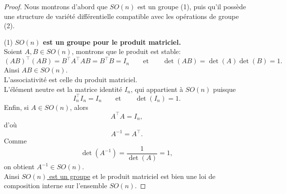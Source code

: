 \documentclass[12pt]{report}
\begin{document}
\begin{proof}
Nous montrons d'abord que $SO(n)$ est un groupe (1), puis qu'il possède une structure de variété différentielle compatible avec les opérations de groupe (2). \medskip

(1) \textbf{$SO(n)$ est un groupe pour le produit matriciel.}\\
Soient $A,B\in SO(n)$, montrons que le produit est stable:
\[
{(AB)}^{\top}(AB)=B^{\top}A^{\top}AB=B^{\top}B=I_n\qquad\text{et}\qquad\det(AB)=\det(A)\det(B)=1.
\]
Ainsi $AB\in SO(n)$.\\
L'associativité est celle du produit matriciel.\\
L'élément neutre est la matrice identité $I_n$, qui appartient à $SO(n)$ puisque
\[
I_n^{\top}I_n=I_n\qquad\text{et}\qquad\det(I_n)=1.
\]
Enfin, si $A\in SO(n)$, alors
\[
A^{\top}A=I_n,
\]
d'où
\[
A^{-1}=A^{\top}.
\]
Comme
\[
\det(A^{-1})=\frac{1}{\det(A)}=1,
\]
on obtient $A^{-1}\in SO(n)$.\\
Ainsi \underline{$SO(n)$ est un groupe} et le produit matriciel est bien une loi de composition interne sur l'ensemble $SO(n)$.


\end{proof}
\end{document}
